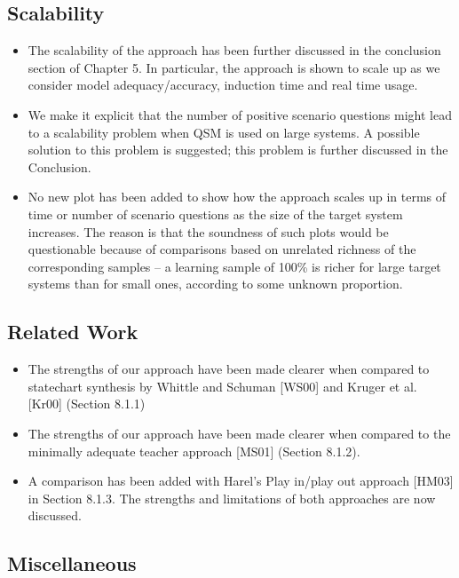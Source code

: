 \documentclass[11pt,oneside,a4paper]{article}
\begin{document}
\subsection*{Scalability}

\begin{itemize}
\item The scalability of the approach has been further discussed in the conclusion section of Chapter 5. In particular, the approach is shown to scale up as we consider model adequacy/accuracy, induction time and real time usage. 
\item We make it explicit that the number of positive scenario questions  might lead to a scalability problem when QSM is used on large systems. A possible solution to this problem is suggested; this problem is further discussed in the Conclusion.
\item No new plot has been added to show how the approach scales up in terms of time or number of scenario questions as the size of the target system increases. The reason is that the soundness of such plots would be questionable because of comparisons based on unrelated richness of the corresponding samples -- a learning sample of 100\% is richer for large target systems than for small ones, according to some unknown proportion.
\end{itemize}

\subsection*{Related Work}

\begin{itemize}
\item The strengths of our approach have been made clearer when compared to statechart synthesis by Whittle and Schuman [WS00] and Kruger et al. [Kr00] (Section 8.1.1)
\item The strengths of our approach have been made clearer when compared to the minimally adequate teacher approach [MS01] (Section 8.1.2).
\item A comparison has been added with Harel's Play in/play out approach [HM03] in Section 8.1.3. The strengths and limitations of both approaches are now discussed.
\end{itemize}

\subsection*{Miscellaneous}
\end{document}
